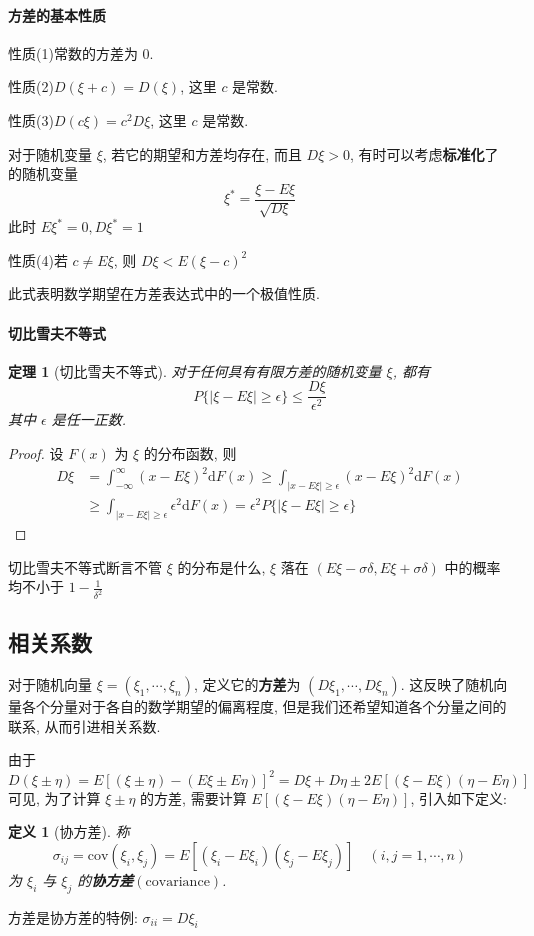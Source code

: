\documentclass[12pt,a4paper]{article}
\newtheorem{thm}{定理}[subsection]  %
\newtheorem{definition}{定义}[subsection] %
\begin{document}
\paragraph{方差的基本性质}\mbox{}

性质(1)\quad 常数的方差为 $0$.

性质(2)\quad $D(\xi + c) = D(\xi)$, 这里 $c$ 是常数.

性质(3)\quad $D(c\xi) = c^2D\xi$, 这里 $c$ 是常数.

对于随机变量 $\xi$, 若它的期望和方差均存在, 而且 $D\xi > 0$, 有时可以考虑\textbf{标准化}了的随机变量\[\xi^* = \frac{\xi - E\xi}{\sqrt{D\xi}}\]
此时 $E\xi^* = 0, D\xi^* = 1$

性质(4)\quad 若 $c \neq E\xi$, 则 $D\xi < E(\xi - c)^2$

此式表明数学期望在方差表达式中的一个极值性质.

\paragraph{切比雪夫不等式}
\begin{thm}[切比雪夫不等式]
    对于任何具有有限方差的随机变量 $\xi$, 都有\[P\{ |\xi-E\xi| \geq \epsilon\} \leq \frac{D\xi}{\epsilon^2}\] 其中 $\epsilon$ 是任一正数.
\end{thm}
\begin{proof}
    设 $F(x)$ 为 $\xi$ 的分布函数, 则
    \[\begin{aligned}
        D\xi & = \int_{-\infty}^{\infty} (x - E\xi)^2 \mathrm{d}F(x) \geq \int_{|x-E\xi|\geq \epsilon} (x-E\xi)^2\mathrm{d}F(x)\\
        & \geq \int_{|x-E\xi| \geq \epsilon} \epsilon^2 \mathrm{d}F(x) = \epsilon^2 P\{|\xi-E\xi| \geq \epsilon\}
    \end{aligned}\]
\end{proof}
切比雪夫不等式断言不管 $\xi$ 的分布是什么, $\xi$ 落在 $(E\xi-\sigma\delta, E\xi+\sigma\delta)$ 中的概率均不小于 $1-\frac{1}{\delta^2}$

\subsection{相关系数}
对于随机向量 $\xi = (\xi_1, \cdots, \xi_n)$, 定义它的\textbf{方差}为 $(D\xi_1, \cdots, D\xi_n)$. 
这反映了随机向量各个分量对于各自的数学期望的偏离程度, 但是我们还希望知道各个分量之间的联系, 从而引进相关系数.

由于\[D(\xi \pm \eta) = E[(\xi \pm \eta) - (E\xi \pm E\eta)]^2 = D\xi + D\eta \pm 2E[(\xi - E\xi)(\eta - E\eta)]\]
可见, 为了计算 $\xi \pm \eta$ 的方差, 需要计算 $E[(\xi - E\xi)(\eta - E\eta)]$, 引入如下定义:
\begin{definition}[协方差]
    称\[\sigma_{ij} = \mathrm{cov}(\xi_i, \xi_j) = E[(\xi_i - E\xi_i)(\xi_j - E\xi_j)] \quad (i,j = 1,\cdots, n)\]
    为 $\xi_i$ 与 $\xi_j$ 的\textbf{协方差}$(\mathrm{covariance})$.
\end{definition}
方差是协方差的特例: $\sigma_{ii} = D\xi_i$
\end{document}
